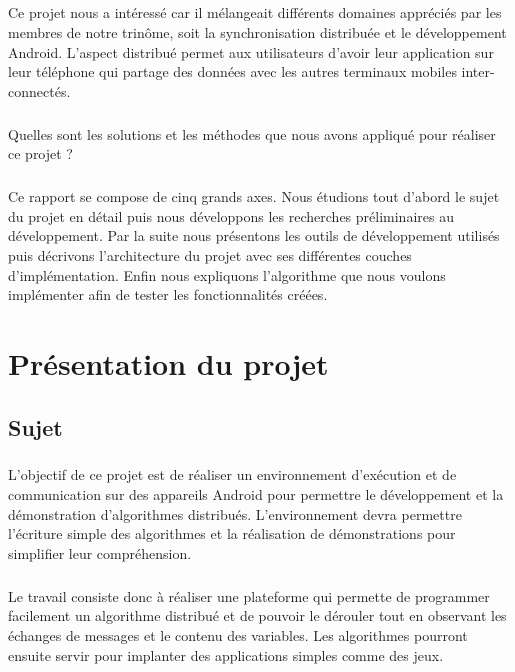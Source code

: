 \documentclass[a4paper,10pt]{report}
\begin{document}
  \paragraph{}
  Ce projet nous a intéressé car il mélangeait différents domaines appréciés par les membres de notre trinôme, soit la synchronisation distribuée et le développement Android.
  L'aspect distribué permet aux utilisateurs d'avoir leur application sur leur téléphone qui partage des données avec les autres terminaux mobiles inter-connectés.
  \paragraph{}
  Quelles sont les solutions et les méthodes que nous avons appliqué pour réaliser ce projet ?
  \paragraph{}
  Ce rapport se compose de cinq grands axes. Nous étudions tout d'abord le sujet du projet en détail puis nous développons les recherches préliminaires au développement. 	Par la suite nous présentons les outils de développement utilisés puis décrivons l'architecture du projet avec ses différentes couches d'implémentation. Enfin nous expliquons l'algorithme que nous voulons implémenter afin de tester les fonctionnalités créées.

\chapter{Présentation du projet}
  \section{Sujet}
  \paragraph{}
  L’objectif de ce projet est de réaliser un environnement d’exécution et de communication
  sur des appareils Android pour permettre le développement et la démonstration
  d’algorithmes distribués. L’environnement devra permettre l'écriture simple des algorithmes
  et la réalisation de démonstrations pour simplifier leur compréhension.
  \paragraph{}
  Le travail consiste donc à réaliser une plateforme qui permette de programmer facilement un algorithme
  distribué et de pouvoir le dérouler tout en observant les échanges de messages et
  le contenu des variables.
  Les algorithmes pourront ensuite servir pour implanter des applications simples comme
  des jeux. 
\end{document}
